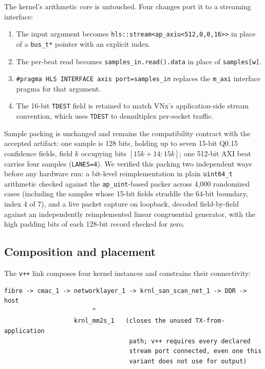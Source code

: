 \documentclass[11pt,a4paper]{article}
\newcommand{\code}[1]{\texttt{#1}}
\begin{document}
The kernel's arithmetic core is untouched. Four changes port it to a
streaming interface:

\begin{enumerate}[label=(\arabic*)]
  \item The input argument becomes
    \code{hls::stream<ap\_axiu<512,0,0,16>>} in place of a
    \code{bus\_t*} pointer with an explicit index.
  \item The per-beat read becomes \code{samples\_in.read().data} in
    place of \code{samples[w]}.
  \item \code{\#pragma HLS INTERFACE axis port=samples\_in} replaces the
    \code{m\_axi} interface pragma for that argument.
  \item The 16-bit \code{TDEST} field is retained to match VNx's
    application-side stream convention, which uses \code{TDEST} to
    demultiplex per-socket traffic.
\end{enumerate}

Sample packing is unchanged and remains the compatibility contract with
the accepted artifact: one sample is 128 bits, holding up to seven
15-bit Q0.15 confidence fields, field $k$ occupying bits
$[15k{+}14 : 15k]$; one 512-bit AXI beat carries four samples
(\code{LANES=4}). We verified this packing two independent ways before
any hardware run: a bit-level reimplementation in plain \code{uint64\_t}
arithmetic checked against the \code{ap\_uint}-based packer across
4{,}000 randomized cases (including the samples whose 15-bit fields
straddle the 64-bit boundary, index 4 of 7), and a live packet capture
on loopback, decoded field-by-field against an independently
reimplemented linear congruential generator, with the high padding bits
of each 128-bit record checked for zero.

\subsection{Composition and placement}

The \code{v++} link composes four kernel instances and constrains their
connectivity:

\begin{center}
\begin{lstlisting}
fibre -> cmac_1 -> networklayer_1 -> krnl_san_scan_net_1 -> DDR -> host
                        ^
                   krnl_mm2s_1   (closes the unused TX-from-application
                                  path; v++ requires every declared
                                  stream port connected, even one this
                                  variant does not use for output)
\end{lstlisting}
\end{center}
\end{document}
